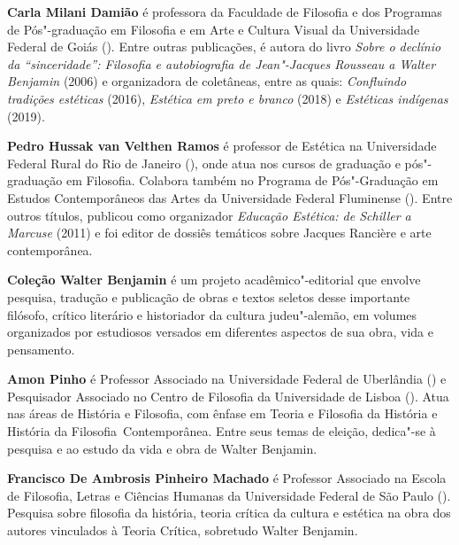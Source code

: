 \textbf{Carla Milani Damião} é professora da Faculdade de Filosofia e dos Programas de Pós"-graduação em Filosofia e em Arte e Cultura Visual da Universidade Federal de Goiás ().
Entre outras publicações, é autora do livro \emph{Sobre o declínio da ``sinceridade'': Filosofia e
autobiografia de Jean"-Jacques Rousseau a Walter Benjamin} (2006) e organizadora de
coletâneas, entre as quais: \emph{Confluindo tradições estéticas} (2016), \emph{Estética em preto e branco} (2018) e \emph{Estéticas indígenas} (2019).

\textbf{Pedro Hussak van Velthen Ramos} é professor de Estética na Universidade Federal Rural do
Rio de Janeiro (), onde atua nos cursos de graduação e pós"-graduação em Filosofia.
Colabora também no Programa de Pós"-Graduação em Estudos Contemporâneos das Artes da
Universidade Federal Fluminense (). Entre outros títulos, publicou como organizador \emph{Educação Estética: de Schiller a Marcuse} (2011) e foi editor de dossiês temáticos sobre Jacques Rancière e arte contemporânea.

\textbf{Coleção Walter Benjamin} é um projeto acadêmico"-editorial que envolve pesquisa, tradução e publicação de obras e textos seletos desse importante filósofo, crítico literário e historiador da cultura judeu"-alemão, em volumes organizados por estudiosos versados em diferentes aspectos de sua obra, vida e pensamento. 

\textbf{Amon Pinho} é Professor Associado na Universidade Federal de Uberlândia () e Pesquisador Associado no Centro de Filosofia da Universidade de Lisboa (). Atua nas
áreas de História e Filosofia, com ênfase em Teoria e Filosofia da História e História da Filosofia~Contemporânea. Entre seus temas de eleição, dedica"-se à pesquisa e ao estudo da vida e obra de
Walter Benjamin.

\textbf{Francisco De Ambrosis Pinheiro Machado} é Professor Associado na Escola de Filosofia, Letras e Ciências Humanas da Universidade Federal de São Paulo (). Pesquisa sobre filosofia da história, teoria crítica da cultura e estética na obra dos autores vinculados à Teoria Crítica, sobretudo Walter Benjamin. \enlargethispage{\baselineskip}



